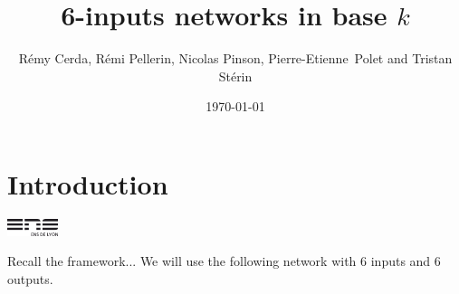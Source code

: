 \documentclass{beamer}
\title{6-inputs networks in base $k$}
\author[R. Cerda, R. Pellerin, N. Pinson, P.-E. Polet, T. Sterin]{Rémy Cerda, Rémi Pellerin, Nicolas Pinson, Pierre-Etienne~Polet and Tristan Stérin}
\institute{ENS Lyon}
\date{\today}
\begin{document}

\section{Introduction}

\begin{frame}
	\titlepage
	\begin{center}
		\includegraphics[height=0.5cm]{logoens.png}
	\end{center}
\end{frame}


\begin{frame}{Recall the framework...}
	We will use the following network with 6 inputs and 6 outputs.


\end{frame}
\end{document}
